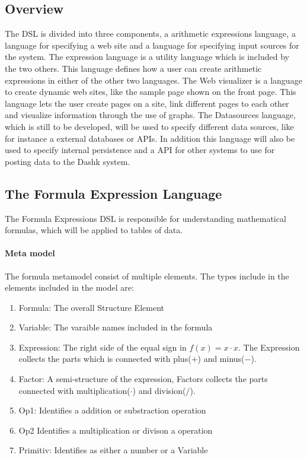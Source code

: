 \subsection{Overview}
The DSL is divided into three components, a arithmetic expressions language, a language for specifying a web site and a language for specifying input sources for the system. 
The expression language is a utility language which is included by the two others. 
This language defines how a user can create arithmetic expressions in either of the other two languages. 
The Web visualizer is a language to create dynamic web sites, like the sample page shown on the front page. 
This language lets the user create pages on a site, link different pages to each other and visualize information through the use of graphs. 
The Datasources language, which is still to be developed, will be used to specify different data sources, like for instance a external databases or APIs. 
In addition this language will also be used to specify internal persistence and a API for other systems to use for posting data to the Dashk system.

\subsection{The Formula Expression Language}
The Formula Expressions DSL is responsible for understanding mathematical formulas, which will be applied to tables of data.
\paragraph{Meta model}
The formula metamodel consist of multiple elements.
The types include in the elements included in the model are:
\begin{enumerate}
\item Formula: The overall Structure Element
\item Variable: The varaible names included in the formula
\item Expression: The right side of the equal sign in $f(x) = x \cdot x$. The Expression collects the parts which is connected with plus($+$) and minus($-$). 
\item Factor: A semi-structure of the expression, Factors collects the parts connected with multiplication($\cdot$) and division($/$).
\item Op1: Identifies a addition or substraction operation
\item Op2 Identifies a multiplication or divison a operation
\item Primitiv: Identifies as either a number or a Variable
\end{enumerate}

